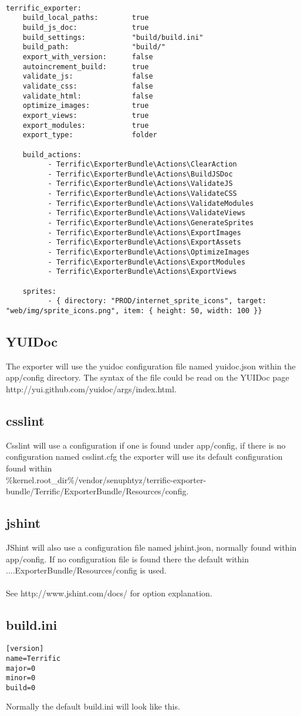 \begin{verbatim}

terrific_exporter:
	build_local_paths:        true
	build_js_doc:             true
	build_settings:           "build/build.ini"
	build_path:               "build/"
	export_with_version:      false
	autoincrement_build:      true
	validate_js:              false
	validate_css:             false
	validate_html:            false
	optimize_images:          true
	export_views:             true
	export_modules:           true
	export_type:              folder

	build_actions:
	      - Terrific\ExporterBundle\Actions\ClearAction
	      - Terrific\ExporterBundle\Actions\BuildJSDoc
	      - Terrific\ExporterBundle\Actions\ValidateJS
	      - Terrific\ExporterBundle\Actions\ValidateCSS
	      - Terrific\ExporterBundle\Actions\ValidateModules
	      - Terrific\ExporterBundle\Actions\ValidateViews
	      - Terrific\ExporterBundle\Actions\GenerateSprites
	      - Terrific\ExporterBundle\Actions\ExportImages
	      - Terrific\ExporterBundle\Actions\ExportAssets
	      - Terrific\ExporterBundle\Actions\OptimizeImages
	      - Terrific\ExporterBundle\Actions\ExportModules
	      - Terrific\ExporterBundle\Actions\ExportViews

	sprites:
	      - { directory: "PROD/internet_sprite_icons", target: "web/img/sprite_icons.png", item: { height: 50, width: 100 }}

\end{verbatim}

\subsection{YUIDoc}
The exporter will use the yuidoc configuration file named yuidoc.json within the app/config directory. The syntax of the file could be read on the YUIDoc page http://yui.github.com/yuidoc/args/index.html. 

\subsection{csslint}
Csslint will use a configuration if one is found under app/config, if there is no configuration named csslint.cfg the exporter will use its default configuration found within \\ 
\%kernel.root_dir\%/vendor/senuphtyz/terrific-exporter-bundle/Terrific/ExporterBundle/Resources/config. \\

\subsection{jshint}
JShint will also use a configuration file named jshint.json, normally found within app/config. If no configuration file is found there the default within ....ExporterBundle/Resources/config is used.\\
\\
See http://www.jshint.com/docs/ for option explanation.\\

\subsection{build.ini}

\begin{verbatim}
[version]
name=Terrific
major=0
minor=0
build=0
\end{verbatim}
\noindent Normally the default build.ini will look like this. 